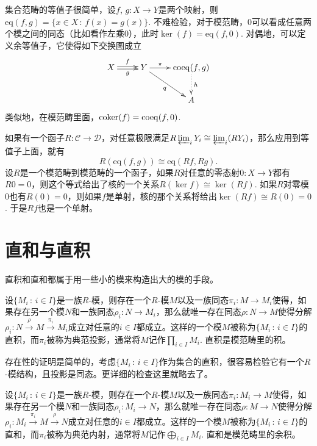 集合范畴的等值子很简单，设$f$, $g:X\to Y$是两个映射，则$\mathrm{eq}(f,g)=\{x\in X\,:\, f(x)=g(x)\}$. 不难检验，对于模范畴，$0$可以看成任意两个模之间的同态（比如看作左乘$0$），此时$\ker(f)=\mathrm{eq}(f,0)$. 对偶地，可以定义余等值子，它使得如下交换图成立
\[
\begin{xy}
	\xymatrix{
		X\ar@<0.3ex>[r]^-{f} \ar@<-0.3ex>[r]_-{g}&Y\ar[r]^-{\pi}\ar[dr]_-{q}&\mathrm{coeq}(f,g)\ar@{.>}[d]^-{h}\\
		&&A
	}
\end{xy}
\]
类似地，在模范畴里面，$\operatorname{coker}(f)=\mathrm{coeq}(f,0)$.

如果有一个函子$R:\mathcal{C}\to \mathcal{D}$，对任意极限满足$R\varprojlim_i Y_i\cong \varprojlim_i (RY_i)$，那么应用到等值子上面，就有
\[
	R\left(\mathrm{eq}(f,g)\right)\cong \mathrm{eq}(Rf,Rg).
\]
设$R$是一个模范畴到模范畴的一个函子，如果$R$对任意的零态射$0:X\to Y$都有$R0=0$，则这个等式给出了核的一个关系$R\left(\ker f\right)\cong \ker(Rf)$. 如果$R$对零模$0$也有$R(0)=0$，则如果$f$是单射，核的那个关系将给出$\ker(Rf)\cong R(0)=0$. 于是$Rf$也是一个单射。

\section{直和与直积}

直积和直和都属于用一些小的模来构造出大的模的手段。

\para 设$\{M_i\,:\, i\in I\}$是一族$R$-模，则存在一个$R$-模$M$以及一族同态$\pi_i:M\to M_i$使得，如果存在另一个模$N$和一族同态$\rho_i:N\to M_i$，那么就唯一存在同态$\rho:N\to M$使得分解$\rho_i:N\xrightarrow{\rho} M \xrightarrow{\pi_i} M_i$成立对任意的$i\in I$都成立。这样的一个模$M$被称为$\{M_i\,:\, i\in I\}$的直积，而$\pi_i$被称为典范投影，通常将$M$记作$\prod_{i\in I}M_i$. 直积是模范畴里的积。

存在性的证明是简单的，考虑$\{M_i\,:\, i\in I\}$作为集合的直积，很容易检验它有一个$R$-模结构，且投影是同态。更详细的检查这里就略去了。


\para 设$\{M_i\,:\, i\in I\}$是一族$R$-模，则存在一个$R$-模$M$以及一族同态$\pi_i:M_i\to M$使得，如果存在另一个模$N$和一族同态$\rho_i:M_i\to N$，那么就唯一存在同态$\rho:M\to N$使得分解$\rho_i:M_i\xrightarrow{\pi_i} M \xrightarrow{\rho} N$成立对任意的$i\in I$都成立。这样的一个模$M$被称为$\{M_i\,:\, i\in I\}$的直和，而$\pi_i$被称为典范内射，通常将$M$记作$\bigoplus_{i\in I}M_i$. 直和是模范畴里的余积。

